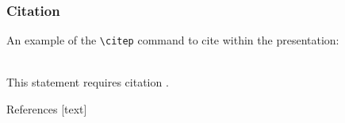 \documentclass{beamer}
\numberwithin{figure}{section}
\numberwithin{equation}{section}
\begin{document}
\begin{frame}[fragile] %
\frametitle{Citation}
An example of the \verb|\citep| command to cite within the presentation:\\~

This statement requires citation \citep{skogestad2003simple}.
\end{frame}


\begin{frame}[allowframebreaks]{References}
 [text]
 
 {}
\end{frame}


\ThankYouFrame

\end{document}
